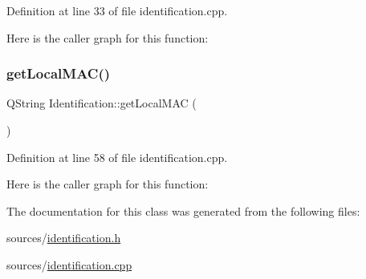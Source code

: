 Definition at line 33 of file identification.\+cpp.

Here is the caller graph for this function\+:
\mbox{\label{class_identification_aecfba4e5f0c1640f52a6e2b8e01e457e}} 
\subsubsection{\texorpdfstring{get\+Local\+M\+A\+C()}{getLocalMAC()}}
{\footnotesize\ttfamily Q\+String Identification\+::get\+Local\+M\+AC (\begin{DoxyParamCaption}{ }\end{DoxyParamCaption})\hspace{0.3cm}{\ttfamily [static]}}



Definition at line 58 of file identification.\+cpp.

Here is the caller graph for this function\+:


The documentation for this class was generated from the following files\+:\begin{DoxyCompactItemize}
\item 
sources/\mbox{\hyperlink{identification_8h}{identification.\+h}}\item 
sources/\mbox{\hyperlink{identification_8cpp}{identification.\+cpp}}\end{DoxyCompactItemize}
